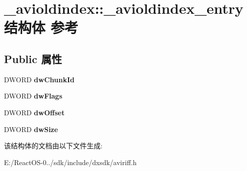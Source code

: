 \hypertarget{struct__avioldindex_1_1__avioldindex__entry}{}\section{\+\_\+avioldindex\+:\+:\+\_\+avioldindex\+\_\+entry结构体 参考}
\label{struct__avioldindex_1_1__avioldindex__entry}
\subsection*{Public 属性}
\begin{DoxyCompactItemize}
\item 
\mbox{\label{struct__avioldindex_1_1__avioldindex__entry_ac44e37fb89499e4b735b8a130cc55713}} 
D\+W\+O\+RD {\bfseries dw\+Chunk\+Id}
\item 
\mbox{\label{struct__avioldindex_1_1__avioldindex__entry_aef4be448064d299b09838793d107ac57}} 
D\+W\+O\+RD {\bfseries dw\+Flags}
\item 
\mbox{\label{struct__avioldindex_1_1__avioldindex__entry_a7f920528d612ab8e3c5dc5a8e4c2f287}} 
D\+W\+O\+RD {\bfseries dw\+Offset}
\item 
\mbox{\label{struct__avioldindex_1_1__avioldindex__entry_a0483289417c1729d3d75602151aa62d6}} 
D\+W\+O\+RD {\bfseries dw\+Size}
\end{DoxyCompactItemize}


该结构体的文档由以下文件生成\+:\begin{DoxyCompactItemize}
\item 
E\+:/\+React\+O\+S-\/0../sdk/include/dxsdk/aviriff.\+h\end{DoxyCompactItemize}
